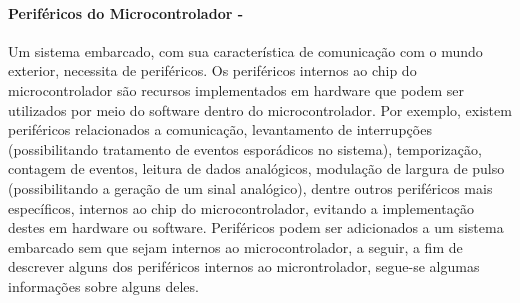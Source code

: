 \paragraph{\textbf{Periféricos do Microcontrolador -}}
Um sistema embarcado, com sua característica de comunicação com o mundo exterior, necessita de periféricos. Os periféricos internos ao chip do microcontrolador são recursos implementados em hardware que podem ser utilizados por meio do software dentro do microcontrolador. Por exemplo, existem periféricos relacionados a comunicação, levantamento de interrupções (possibilitando tratamento de eventos esporádicos no sistema), temporização, contagem de eventos, leitura de dados analógicos, modulação de largura de pulso (possibilitando a geração de um sinal analógico), dentre outros periféricos mais específicos, internos ao chip do microcontrolador, evitando a implementação destes em hardware ou software. Periféricos podem ser adicionados a um sistema embarcado sem que sejam internos ao microcontrolador, a seguir, a fim de descrever alguns dos periféricos internos ao microntrolador, segue-se algumas informações sobre alguns deles.
